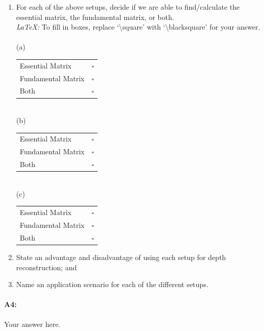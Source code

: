 \begin{enumerate}
\item For each of the above setups, decide if we are able to find/calculate the essential matrix, the fundamental matrix, or both. \\
\emph{LaTeX:} To fill in boxes, replace `\textbackslash square' with `\textbackslash blacksquare' for your answer. \\ \\
(a)
\begin{tabular}[h]{lc}
\toprule
Essential Matrix & $\square$ \\
Fundamental Matrix & $\square$ \\
Both & $\square$ \\
\end{tabular} \\
(b)
\begin{tabular}[h]{lc}
\toprule
Essential Matrix & $\square$ \\
Fundamental Matrix & $\square$ \\
Both & $\square$ \\
\end{tabular} \\
(c)
\begin{tabular}[h]{lc}
\toprule
Essential Matrix & $\square$ \\
Fundamental Matrix & $\square$ \\
Both & $\square$ \\
\bottomrule
\end{tabular}
\item State an advantage and disadvantage of using each setup for depth reconstruction; and
\item Name an application scenario for each of the different setups.
\end{enumerate}

\paragraph{A4:} Your answer here.





